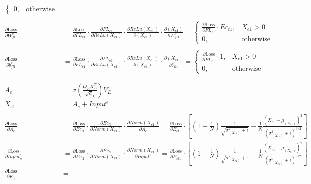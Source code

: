 \documentclass[12pt,letterpaper]{article}
\begin{document}
\begin{align*}
\begin{cases}
    0, & \text{otherwise}
    \end{cases} \\
\\
\frac{\partial \text{Loss}}{\partial W^e_{fl1}} &= %
\frac{\partial \text{Loss}}{\partial FL_{e1}} \cdot
\frac{\partial FL_{e1}}{\partial ReLu(X_{e1})} \cdot
\frac{\partial ReLu(X_{e1})}{\partial (X_{e1})} \cdot
\frac{\partial (X_{e1})}{\partial W^e_{fl1}}=
 \begin{cases}
    \frac{\partial \text{Loss}}{\partial FL_{e1}} \cdot Ec_{t1}, &  X_{e1} > 0 \\
    0, & \text{otherwise}
    \end{cases} \\ 
\\
\frac{\partial \text{Loss}}{\partial b^e_{fl1}} &= %
\frac{\partial \text{Loss}}{\partial FL_{e1}} \cdot
\frac{\partial FL_{e1}}{\partial ReLu(X_{e1})} \cdot
\frac{\partial ReLu(X_{e1})}{\partial (X_{e1})} \cdot
\frac{\partial (X_{e1})}{\partial b^e_{fl1}}=
\begin{cases}
\frac{\partial \text{Loss}}{\partial FL_{e1}} \cdot1, &  X_{e1} > 0 \\
0, & \text{otherwise}
\end{cases} \\ 
\\
\\
A_{e}&=\sigma(\frac{Q_{E} K_{E}^T}{\sqrt d_k})V_{E}
\\
X_{e1}&=A_{e}+Input^{e}
\\
\\
\frac{\partial \text{Loss}}{\partial A_{e}} &= %
\frac{\partial \text{Loss}}{\partial Ec_{t1}} \cdot 
\frac{\partial Ec_{t1}}{\partial Norm(X_{e1})} \cdot 
\frac{\partial Norm(X_{e1})}{\partial A_{e}}=
\frac{\partial \text{Loss}}{\partial E_{ct1}}\cdot 
\left[(1-\frac{1}{N}) \frac{1}{\sqrt{\sigma^2_{(X_{e1})}+\epsilon}}-\frac{1}{N}\frac{(X_{e1}-\mu_{(X_{e1})})^2}{(\sigma^2_{(X_{e1})}+\epsilon)^{3/2}}\right] 
\\
\frac{\partial \text{Loss}}{\partial Input^{e}_n} &= %
\frac{\partial \text{Loss}}{\partial Ec_{t1}} \cdot 
\frac{\partial Ec_{t1}}{\partial Norm(X_{e1})} \cdot 
\frac{\partial Norm(X_{e1})}{\partial Input^{e}} =
\frac{\partial \text{Loss}}{\partial E_{ct1}}\cdot 
\left[(1-\frac{1}{N}) \frac{1}{\sqrt{\sigma^2_{(X_{e1})}+\epsilon}}-\frac{1}{N}\frac{(X_{e1}-\mu_{(X_{e1})})^2}{(\sigma^2_{(X_{e1})}+\epsilon)^{3/2}}\right] 
\\
\frac{\partial \text{Loss}}{\partial K_{e}} &= %

\end{align*}
\end{document}
